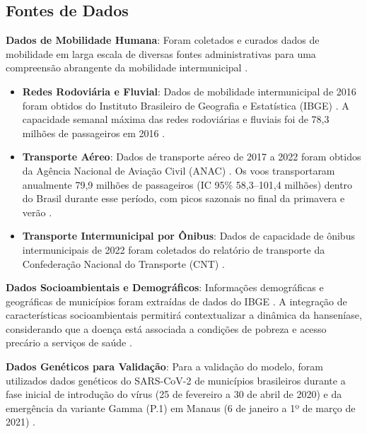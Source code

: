 \documentclass[preprint,12pt]{elsarticle}
\begin{document}
\subsection{Fontes de Dados}
\textbf{Dados de Mobilidade Humana}: Foram coletados e curados dados de mobilidade em larga escala de diversas fontes administrativas para uma compreensão abrangente da mobilidade intermunicipal \cite{oliveira2024data}.
\begin{itemize}[label=\textbullet]
    \item \textbf{Redes Rodoviária e Fluvial}: Dados de mobilidade intermunicipal de 2016 foram obtidos do Instituto Brasileiro de Geografia e Estatística (IBGE) \cite{oliveira2024summary, oliveira2024data, inovacao2024modelagem, peixoto2020modeling}. A capacidade semanal máxima das redes rodoviárias e fluviais foi de 78,3 milhões de passageiros em 2016 \cite{oliveira2024findings}.
    \item \textbf{Transporte Aéreo}: Dados de transporte aéreo de 2017 a 2022 foram obtidos da Agência Nacional de Aviação Civil (ANAC) \cite{oliveira2024summary, oliveira2024data, oliveira2024transport, inovacao2024modelagem}. Os voos transportaram anualmente 79,9 milhões de passageiros (IC 95\% 58,3--101,4 milhões) dentro do Brasil durante esse período, com picos sazonais no final da primavera e verão \cite{oliveira2024findings, inovacao2024modelagem}.
    \item \textbf{Transporte Intermunicipal por Ônibus}: Dados de capacidade de ônibus intermunicipais de 2022 foram coletados do relatório de transporte da Confederação Nacional do Transporte (CNT) \cite{oliveira2024summary, oliveira2024data, oliveira2024transport}.
\end{itemize}
\textbf{Dados Socioambientais e Demográficos}: Informações demográficas e geográficas de municípios foram extraídas de dados do IBGE \cite{inovacao2024modelagem}. A integração de características socioambientais permitirá contextualizar a dinâmica da hanseníase, considerando que a doença está associada a condições de pobreza e acesso precário a serviços de saúde \cite{inovacao2024heterogeneidade, ministerio2022protocolo}.

\textbf{Dados Genéticos para Validação}: Para a validação do modelo, foram utilizados dados genéticos do SARS-CoV-2 de municípios brasileiros durante a fase inicial de introdução do vírus (25 de fevereiro a 30 de abril de 2020) e da emergência da variante Gamma (P.1) em Manaus (6 de janeiro a 1º de março de 2021) \cite{oliveira2024summary, oliveira2024genetic, oliveira2024transport}.
\end{document}
